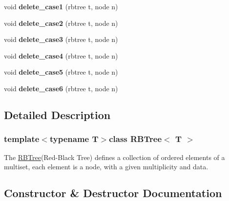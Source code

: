 \begin{DoxyCompactItemize}
\item 
\hypertarget{class_r_b_tree_a5409045dc18a80b95c889c2298436269}{}void {\bfseries delete\+\_\+case1} (rbtree t, node n)\label{class_r_b_tree_a5409045dc18a80b95c889c2298436269}

\item 
\hypertarget{class_r_b_tree_a693e3566ba03c0f8a31b02ed9ecc5883}{}void {\bfseries delete\+\_\+case2} (rbtree t, node n)\label{class_r_b_tree_a693e3566ba03c0f8a31b02ed9ecc5883}

\item 
\hypertarget{class_r_b_tree_a30bd007f9b921a2c4dc16874f8fcdda9}{}void {\bfseries delete\+\_\+case3} (rbtree t, node n)\label{class_r_b_tree_a30bd007f9b921a2c4dc16874f8fcdda9}

\item 
\hypertarget{class_r_b_tree_a3d1a670dacddb38ae89394481bec828e}{}void {\bfseries delete\+\_\+case4} (rbtree t, node n)\label{class_r_b_tree_a3d1a670dacddb38ae89394481bec828e}

\item 
\hypertarget{class_r_b_tree_a63e4a6c82ea115b4c167b568ac385849}{}void {\bfseries delete\+\_\+case5} (rbtree t, node n)\label{class_r_b_tree_a63e4a6c82ea115b4c167b568ac385849}

\item 
\hypertarget{class_r_b_tree_a32da5ac7d5b3fe0649ee5dbe54268569}{}void {\bfseries delete\+\_\+case6} (rbtree t, node n)\label{class_r_b_tree_a32da5ac7d5b3fe0649ee5dbe54268569}

\end{DoxyCompactItemize}


\subsection{Detailed Description}
\subsubsection*{template$<$typename T$>$class R\+B\+Tree$<$ T $>$}

The \hyperlink{class_r_b_tree}{R\+B\+Tree}(Red-\/\+Black Tree) defines a collection of ordered elements of a multiset, each element is a node, with a given multiplicity and data. 

\subsection{Constructor \& Destructor Documentation}
\hypertarget{class_r_b_tree_a743575c444246d79b343bf7f8090eb9f}{}
